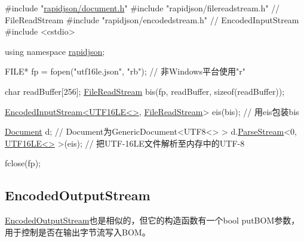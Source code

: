 \begin{DoxyCode}
\textcolor{preprocessor}{#include "\hyperlink{document_8h}{rapidjson/document.h}"}
\textcolor{preprocessor}{#include "rapidjson/filereadstream.h"}   \textcolor{comment}{// FileReadStream}
\textcolor{preprocessor}{#include "rapidjson/encodedstream.h"}    \textcolor{comment}{// EncodedInputStream}
\textcolor{preprocessor}{#include <cstdio>}

\textcolor{keyword}{using namespace }\hyperlink{namespacerapidjson}{rapidjson};

FILE* fp = fopen(\textcolor{stringliteral}{"utf16le.json"}, \textcolor{stringliteral}{"rb"}); \textcolor{comment}{// 非Windows平台使用"r"}

\textcolor{keywordtype}{char} readBuffer[256];
\hyperlink{class_file_read_stream}{FileReadStream} bis(fp, readBuffer, \textcolor{keyword}{sizeof}(readBuffer));

\hyperlink{class_encoded_input_stream}{EncodedInputStream<UTF16LE<>}, \hyperlink{class_file_read_stream}{FileReadStream}> eis(bis);  \textcolor{comment}{//
       用eis包装bis}

\hyperlink{class_generic_document}{Document} d; \textcolor{comment}{// Document为GenericDocument<UTF8<> > }
d.\hyperlink{class_generic_document_afe94c0abc83a20f2d7dc1ba7677e6238}{ParseStream}<0, \hyperlink{struct_u_t_f16_l_e}{UTF16LE<>} >(eis);  \textcolor{comment}{// 把UTF-16LE文件解析至内存中的UTF-8}

fclose(fp);
\end{DoxyCode}
\hypertarget{md_Cadriciel_Commun_Externe_RapidJSON_doc_stream.zh-cn_EncodedOutputStream}{}\subsection{Encoded\+Output\+Stream}\label{md_Cadriciel_Commun_Externe_RapidJSON_doc_stream.zh-cn_EncodedOutputStream}
{\ttfamily \hyperlink{class_encoded_output_stream}{Encoded\+Output\+Stream}}也是相似的，但它的构造函数有一个{\ttfamily bool put\+B\+OM}参数，用于控制是否在输出字节流写入\+B\+O\+M。


